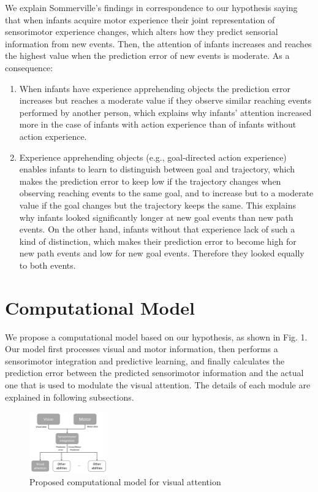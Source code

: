 \documentclass[conference]{IEEEtran}
\begin{document}
We explain Sommerville's findings in correspondence to our hypothesis saying that when infants acquire motor experience their joint representation of sensorimotor experience changes, which alters how they predict sensorial information from new events. Then, the attention of infants increases and reaches the highest value when the prediction error of new events is moderate. As a consequence:

\begin{enumerate}
\item When infants have experience apprehending objects the prediction error increases but reaches a moderate value if they observe similar reaching events performed by another person, which explains why infants’ attention increased more in the case of infants with action experience than of infants without action experience.
\item Experience apprehending objects (e.g., goal-directed action experience) enables infants to learn to distinguish between goal and trajectory, which makes the prediction error to keep low if the trajectory changes when observing reaching events to the same goal, and to increase but to a moderate value if the goal changes but the trajectory keeps the same. This explains why infants looked significantly longer at new goal events than new path events. On the other hand, infants without that experience lack of such a kind of distinction, which makes their prediction error to become high for new path events and low for new goal events. Therefore they looked equally to both events.
\end{enumerate}

\section{Computational Model}
We propose a computational model based on our hypothesis, as shown in Fig. 1. Our model first processes visual and motor information, then performs a sensorimotor integration and predictive learning, and finally calculates the prediction error between the predicted sensorimotor information and the actual one that is used to modulate the visual attention. The details of each module are explained in following subsections.

\begin{figure}
\centering
\includegraphics[width=0.3\textwidth,natwidth=700,natheight=450]{Figure1.png}
\caption{Proposed computational model for visual attention}
\label{figure1}
\end{figure}
\end{document}
